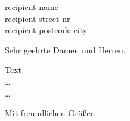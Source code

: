 \documentclass[foldmarks=true,
              foldmarks=blmtP,
              fromalign=right,
              version=last,
              fromphone=true,
              fromemail=true,
              firsthead=true,
              a4paper]
              {scrlttr2}
\begin{document}
	\begin{letter}{
	  recipient name\\
    recipient street nr\\
    recipient postcode city
		}
		\opening{Sehr geehrte Damen und Herren,}
			
			Text\\
			\dots\\
			\dots
			
		\closing{Mit freundlichen Gr\"u\ss en}
	\end{letter}
\end{document}
